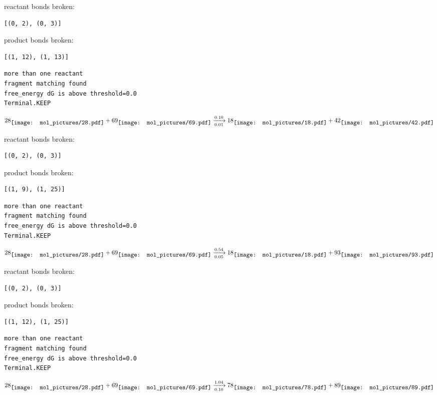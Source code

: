 \documentclass{article}
\begin{document}
reactant bonds broken:\begin{verbatim}
[(0, 2), (0, 3)]
\end{verbatim}
product bonds broken:\begin{verbatim}
[(1, 12), (1, 13)]
\end{verbatim}




\vspace{1cm}
\begin{verbatim}
more than one reactant
fragment matching found
free_energy dG is above threshold=0.0
Terminal.KEEP
\end{verbatim}
$$
28
\raisebox{-.5\height}{\texttt{[image: mol\_pictures/28.pdf]}}
+
69
\raisebox{-.5\height}{\texttt{[image: mol\_pictures/69.pdf]}}
\xrightarrow[0.01]{0.10}
18
\raisebox{-.5\height}{\texttt{[image: mol\_pictures/18.pdf]}}
+
42
\raisebox{-.5\height}{\texttt{[image: mol\_pictures/42.pdf]}}
$$


reactant bonds broken:\begin{verbatim}
[(0, 2), (0, 3)]
\end{verbatim}
product bonds broken:\begin{verbatim}
[(1, 9), (1, 25)]
\end{verbatim}




\vspace{1cm}
\begin{verbatim}
more than one reactant
fragment matching found
free_energy dG is above threshold=0.0
Terminal.KEEP
\end{verbatim}
$$
28
\raisebox{-.5\height}{\texttt{[image: mol\_pictures/28.pdf]}}
+
69
\raisebox{-.5\height}{\texttt{[image: mol\_pictures/69.pdf]}}
\xrightarrow[0.05]{0.54}
18
\raisebox{-.5\height}{\texttt{[image: mol\_pictures/18.pdf]}}
+
93
\raisebox{-.5\height}{\texttt{[image: mol\_pictures/93.pdf]}}
$$


reactant bonds broken:\begin{verbatim}
[(0, 2), (0, 3)]
\end{verbatim}
product bonds broken:\begin{verbatim}
[(1, 12), (1, 25)]
\end{verbatim}




\vspace{1cm}
\begin{verbatim}
more than one reactant
fragment matching found
free_energy dG is above threshold=0.0
Terminal.KEEP
\end{verbatim}
$$
28
\raisebox{-.5\height}{\texttt{[image: mol\_pictures/28.pdf]}}
+
69
\raisebox{-.5\height}{\texttt{[image: mol\_pictures/69.pdf]}}
\xrightarrow[0.10]{1.04}
78
\raisebox{-.5\height}{\texttt{[image: mol\_pictures/78.pdf]}}
+
89
\raisebox{-.5\height}{\texttt{[image: mol\_pictures/89.pdf]}}
$$
\end{document}
